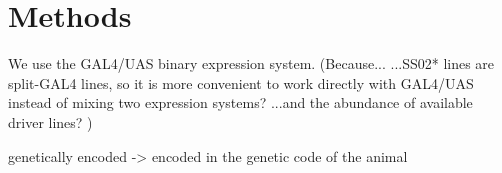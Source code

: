 \chapter{Methods}

\ifpdf
    \graphicspath{{Chapter3/Figs/Raster/}{Chapter3/Figs/PDF/}{Chapter3/Figs/}}
\else
    \graphicspath{{Chapter3/Figs/Vector/}{Chapter3/Figs/}}
\fi


We use the GAL4/UAS binary expression system.
(Because...
	...SS02* lines are split-GAL4 lines, so it is more convenient to work directly with GAL4/UAS instead of mixing two expression systems?
	...and the abundance of available driver lines?
)

genetically encoded -> encoded in the genetic code of the animal
